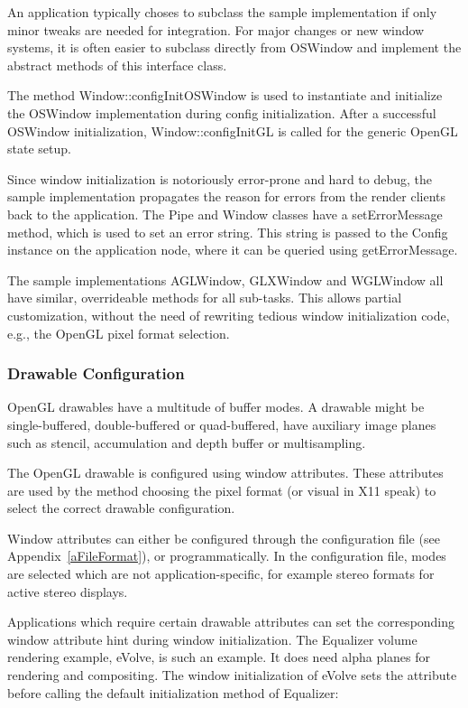 \documentclass[10pt,a4]{scrartcl}
\newcommand{\aref}[1]{Appendix~\ref{#1}}
\begin{document}
An application typically choses to subclass the sample implementation if
only minor tweaks are needed for integration. For major changes or new
window systems, it is often easier to subclass directly from
\textsf{OSWindow} and implement the abstract methods of this interface
class.

The method \textsf{Window::configInitOSWindow} is used to instantiate
and initialize the \textsf{OSWindow} implementation during config
initialization. After a successful \textsf{OSWindow} initialization,
\textsf{Window::configInitGL} is called for the generic OpenGL state
setup.

Since window initialization is notoriously error-prone and hard to
debug, the sample implementation propagates the reason for errors
from the render clients back to the application. The \textsf{Pipe} and
\textsf{Window} classes have a \textsf{setErrorMessage} method, which is
used to set an error string. This string is passed to the
\textsf{Config} instance on the application node, where it can be
queried using \textsf{getErrorMessage}.

The sample implementations \textsf{AGLWindow}, \textsf{GLXWindow} and
\textsf{WGLWindow} all have similar, overrideable methods for all
sub-tasks. This allows partial customization, without the need of
rewriting tedious window initialization code, e.g., the OpenGL pixel
format selection.

\subsubsection{\label{sDrawableConfig}Drawable Configuration}

OpenGL drawables have a multitude of buffer modes. A drawable might be
single-buffered, double-buffered or quad-buffered, have auxiliary image
planes such as stencil, accumulation and depth buffer or multisampling.

The OpenGL drawable is configured using window attributes. These
attributes are used by the method choosing the pixel format (or visual
in X11 speak) to select the correct drawable configuration.

Window attributes can either be configured through the configuration
file (see \aref{aFileFormat}), or programmatically. In the configuration
file, modes are selected which are not application-specific, for example
stereo formats for active stereo displays. 

Applications which require certain drawable attributes can set the
corresponding window attribute hint during window initialization. The
Equalizer volume rendering example, \textsf{eVolve}, is such an
example. It does need alpha planes for rendering and compositing. The
window initialization of \textsf{eVolve} sets the attribute before
calling the default initialization method of Equalizer:
\end{document}
